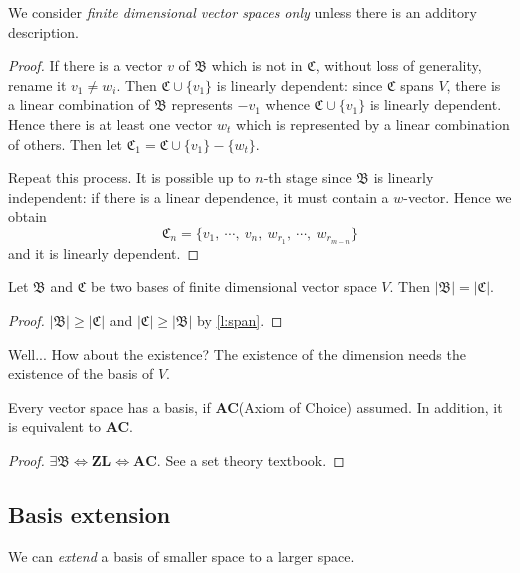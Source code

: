 We consider \textit{finite dimensional vector spaces only} unless there is an additory description.

\begin{proof}
If there is a vector $v$ of $\mathfrak B$ which is not in $\mathfrak C$, without loss of generality, rename it $v_1 \ne w_i$. Then $\mathfrak C \cup \{v_1\}$ is linearly dependent: since $\mathfrak C$ spans $V$, there is a linear combination of $\mathfrak B$ represents $-v_1$ whence $\mathfrak C \cup \{v_1\}$ is linearly dependent. Hence there is at least one vector $w_t$ which is represented by a linear combination of others. Then let $\mathfrak C_1 = \mathfrak C \cup \{v_1\} - \{w_t\}.$

Repeat this process. It is possible up to $n$-th stage since $\mathfrak B$ is linearly independent: if there is a linear dependence, it must contain a $w$-vector. Hence we obtain $$\mathfrak C_n = \{v_1,~\cdots,~v_n,~w_{r_1},~\cdots,~w_{r_{m-n}} \}$$ and it is linearly dependent.
\end{proof}

\begin{theorem} Let $\mathfrak B$ and $\mathfrak C$ be two bases of finite dimensional vector space $V$. Then $|\mathfrak B| = |\mathfrak C|.$
\end{theorem}
\begin{proof}
$|\mathfrak B| \ge  |\mathfrak C|$ and
$|\mathfrak C| \ge  |\mathfrak B|$ by \cref{l:span}.
\end{proof}

Well... How about the existence? The existence of the dimension needs the existence of the basis of $V$.

\begin{theorem} Every vector space has a basis, if \textbf{AC}(Axiom of Choice) assumed. In addition, it is equivalent to \textbf{AC}.
\end{theorem}
\begin{proof}
$\exists \mathfrak B \Longleftrightarrow \mathbf{ZL} \Longleftrightarrow \mathbf{AC}.$ See a set theory textbook.
\end{proof}

\subsection{Basis extension}
We can \textit{extend} a basis of smaller space to a larger space.

